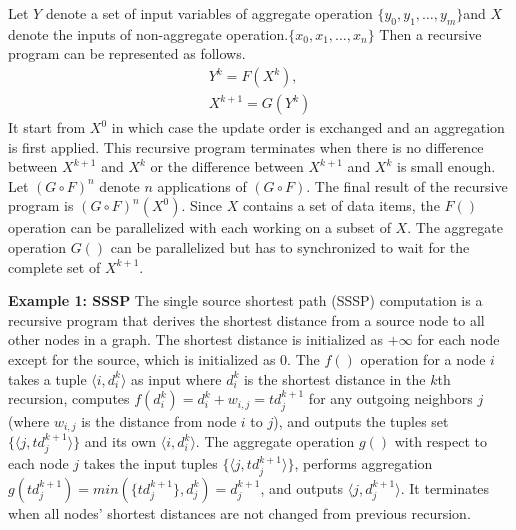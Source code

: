 \documentclass{vldb}
\begin{document}
Let $Y$ denote a set of input variables of aggregate operation $\{y_0,y_1,\dots,y_m\}$and $X$ denote the inputs of non-aggregate  operation.$\{x_0,x_1,\dots,x_n\}$%
Then a recursive program can be represented as follows.
\begin{equation}
\label{eq:recursive2}
\begin{aligned}
Y^{k}=F(X^k),\\
X^{k+1}=G(Y^k)
\end{aligned}
\end{equation}
It  start from $X^0$ in which case the update order is exchanged and an aggregation is first applied. This recursive program terminates when there is no difference between $X^{k+1}$ and $X^k$ or the difference between $X^{k+1}$ and $X^k$ is small enough. Let $(G\circ F)^n$ denote $n$ applications of $(G\circ F)$. The final result of the recursive program is $(G\circ F)^n(X^0)$. Since $X$ contains a set of data items, the $F()$ operation can be parallelized with each working on a subset of $X$. The aggregate operation $G()$ can be parallelized  but has to synchronized to wait for the complete set of $X^{k+1}$.

\textbf{Example 1: SSSP} The single source shortest path (SSSP) computation is a recursive program that derives the shortest distance from a source node to all other nodes in a graph. The shortest distance is initialized as $+\infty$ for each node except for the source, which is initialized as 0. The $f()$ operation for a node $i$ takes a tuple $\langle i,d_i^k\rangle$ as input where $d_i^k$ is the shortest distance in the $k$th recursion, computes $f(d_i^k)=d_i^k+w_{i,j}=td_j^{k+1}$ for any outgoing neighbors $j$ (where $w_{i,j}$ is the distance from node $i$ to $j$), and outputs the tuples set $\{\langle j,td_j^{k+1}\rangle\}$ and its own $\langle i,d_i^k\rangle$. The aggregate operation $g()$ with respect to each node $j$ takes the input tuples $\{\langle j,td_j^{k+1}\rangle\}$, performs aggregation $g(td_j^{k+1})=min(\{td_j^{k+1}\},d_j^k)=d_j^{k+1}$, and outputs $\langle j,d_j^{k+1}\rangle$. It terminates when all nodes' shortest distances are not changed from previous recursion.
\end{document}
